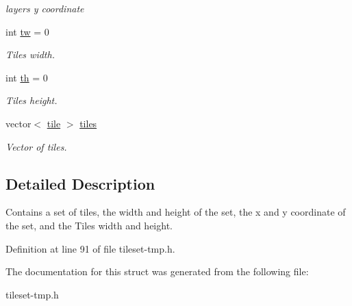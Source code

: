 \begin{DoxyCompactItemize}
\begin{DoxyCompactList}\small\item\em layers y coordinate \end{DoxyCompactList}\item 
int \hyperlink{structTilesettmp_1_1layer_a4d01b39564dae180e8cebfa007c14f3b}{tw} = 0\hypertarget{structTilesettmp_1_1layer_a4d01b39564dae180e8cebfa007c14f3b}{}\label{structTilesettmp_1_1layer_a4d01b39564dae180e8cebfa007c14f3b}

\begin{DoxyCompactList}\small\item\em Tiles width. \end{DoxyCompactList}\item 
int \hyperlink{structTilesettmp_1_1layer_ad34707745232c70eaf0027b5d83ab326}{th} = 0\hypertarget{structTilesettmp_1_1layer_ad34707745232c70eaf0027b5d83ab326}{}\label{structTilesettmp_1_1layer_ad34707745232c70eaf0027b5d83ab326}

\begin{DoxyCompactList}\small\item\em Tiles height. \end{DoxyCompactList}\item 
vector$<$ \hyperlink{structTilesettmp_1_1tile}{tile} $>$ \hyperlink{structTilesettmp_1_1layer_a9966cdba5ba27977a1e2bd273c81cda0}{tiles}\hypertarget{structTilesettmp_1_1layer_a9966cdba5ba27977a1e2bd273c81cda0}{}\label{structTilesettmp_1_1layer_a9966cdba5ba27977a1e2bd273c81cda0}

\begin{DoxyCompactList}\small\item\em Vector of tiles. \end{DoxyCompactList}\end{DoxyCompactItemize}


\subsection{Detailed Description}
Contains a set of tiles, the width and height of the set, the x and y coordinate of the set, and the Tiles width and height. 

Definition at line 91 of file tileset-\/tmp.\+h.



The documentation for this struct was generated from the following file\+:\begin{DoxyCompactItemize}
\item 
tileset-\/tmp.\+h\end{DoxyCompactItemize}
